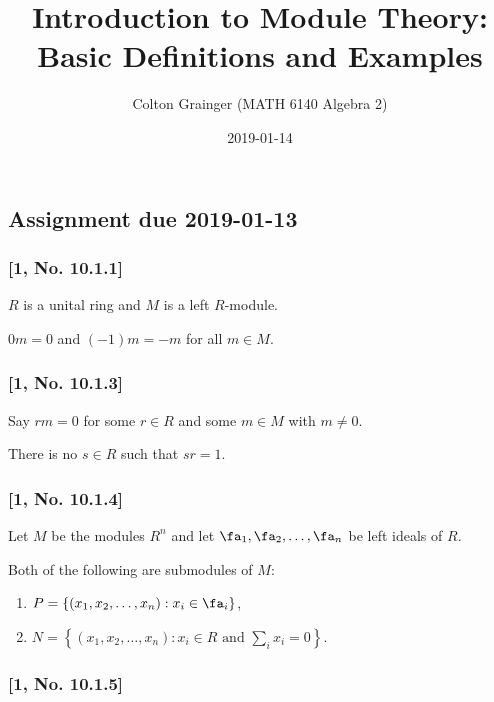\documentclass[11pt]{amsart}
\title{Introduction to Module Theory: Basic Definitions and Examples}
\author{Colton Grainger (MATH 6140 Algebra 2)}
\date{2019-01-14}
\providecommand{\tightlist}{%
  \setlength{\itemsep}{0pt}\setlength{\parskip}{0pt}}
\begin{document}
\maketitle

\setcounter{section}{0}

\subsection{Assignment due 2019-01-13}

\subsubsection{\texorpdfstring{{[}1, No.
10.1.1{]}}{, number 10.1.1{[}1, No. 10.1.1{]}}}

\gvn \(R\) is a unital ring and \(M\) is a left \(R\)-module.

\wts \(0m = 0\) and \((-1)m = -m\) for all \(m \in M\).

\subsubsection{\texorpdfstring{{[}1, No.
10.1.3{]}}{, number 10.1.3{[}1, No. 10.1.3{]}}}

\gvn Say \(rm = 0\) for some \(r \in R\) and some \(m \in M\) with
\(m \neq 0\).

\wts There is no \(s \in R\) such that \(sr =1\).

\subsubsection{\texorpdfstring{{[}1, No.
10.1.4{]}}{, number 10.1.4{[}1, No. 10.1.4{]}}}

\gvn Let \(M\) be the modules \(R^n\) and let
\(\fa_1, \fa_2, \ldots, \fa_n\) be left ideals of \(R\).

\wts Both of the following are submodules of \(M\):

\begin{enumerate}
\def\labelenumi{\alph{enumi}.}
\tightlist
\item
  \(P = \{(x_1, x_2, \ldots, x_n) : x_i \in \fa_i\}\),
\item
  \(N = \left\{(x_1, x_2, \ldots, x_n) : x_i \in R \text{ and } \sum_i x_i = 0\right\}\).
\end{enumerate}

\subsubsection{\texorpdfstring{{[}1, No.
10.1.5{]}}{, number 10.1.5{[}1, No. 10.1.5{]}}}
\end{document}
